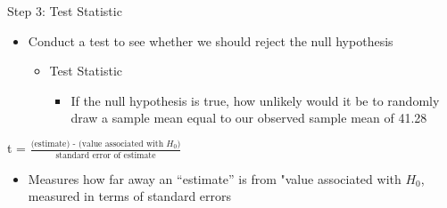 \documentclass[
  8pt,
  ignorenonframetext,
  dvipsnames]{beamer}
\providecommand{\tightlist}{%
  \setlength{\itemsep}{0pt}\setlength{\parskip}{0pt}}
\let\olditem\item
\renewcommand{\item}{%
  \olditem\vspace{4pt}
}
\begin{document}
\begin{frame}{Step 3: Test Statistic}
\protect\hypertarget{step-3-test-statistic}{}

\begin{itemize}
\tightlist
\item
  Conduct a test to see whether we should reject the null hypothesis

  \begin{itemize}
  \tightlist
  \item
    Test Statistic

    \begin{itemize}
    \tightlist
    \item
      If the null hypothesis is true, how unlikely would it be to
      randomly draw a sample mean equal to our observed sample mean of
      41.28
    \end{itemize}
  \end{itemize}
\end{itemize}

\medskip

t =
\(\frac {\text{(estimate) - (value associated with }H_{0})} {\text{standard error of estimate}}\)

\medskip

\begin{itemize}
\tightlist
\item
  Measures how far away an ``estimate'' is from "value associated with
  \(H_0\), measured in terms of standard errors
\end{itemize}

\end{frame}
\end{document}
